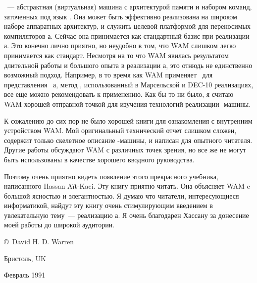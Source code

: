 \ --- абстрактная (виртуальная) машина с архитектурой памяти и набором
команд, заточенных под язык \prolog. Она может быть эффективно реализована на
широком наборе аппаратных архитектур, и служить целевой платформой для
переносимых компиляторов \prolog а. Сейчас она принимается как стандартный базис
при реализации \prolog а. Это конечно лично приятно, но неудобно в том, что WAM
слишком легко принимается как стандарт. Несмотря на то что WAM явилась
результатом длительной работы и большого опыта в реализации \prolog а, это
отнюдь не единственно возможный подход. Например, в то время как WAM применяет
\ для представления
\ \prolog а, метод , использованный в Марсельской и DEC-10 реализациях, все еще можно
рекомендовать к применению. Как бы то ни было, я считаю WAM хорошей отправной
точкой для изучения технологий реализации \prolog-машины.

К сожалению до сих пор не было хорошей книги для ознакомления с внутренним
устройством WAM. Мой оригинальный технический отчет слишком сложен, содержит
только скелетное описание \prolog-машины, и написан для опытного читателя.
Другие работы обсуждают WAM с различных точек зрения, но все же не могут быть
использованы в качестве хорошего вводного руководства.

Поэтому очень приятно видеть появление этого прекрасного учебника, написанного
Hassan A\"it-Kaci. Эту книгу приятно читать. Она объясняет WAM c большой
ясностью и элегантностью. Я думаю что читатели, интересующиеся информатикой,
найдут эту книгу очень стимулирующим введением в увлекательную тему\ ---
реализацию \prolog а. Я очень благодарен Хассану за донесение моей работы до
широкой аудитории.

\bigskip
\copyright\ David H. D. Warren

Бристоль, UK

Февраль 1991










\secup
